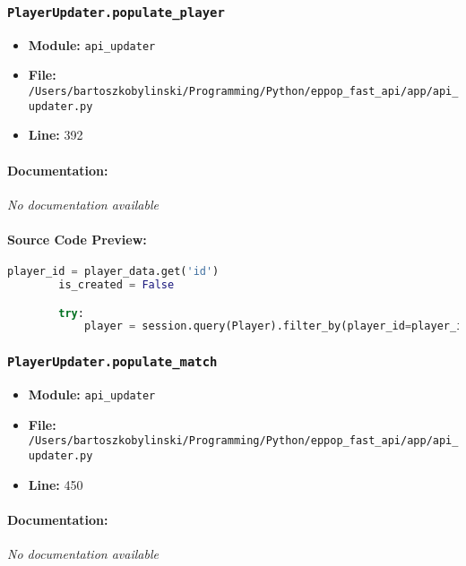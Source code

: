 \documentclass[11pt,a4paper]{article}
\begin{document}
\vspace{1em}
\subsubsection{\texttt{PlayerUpdater.populate\_player}}

\begin{itemize}
    \item \textbf{Module:} \texttt{api\_updater}
    \item \textbf{File:} \texttt{/Users/bartoszkobylinski/Programming/Python/eppop\_fast\_api/app/api\_updater.py}
    \item \textbf{Line:} 392
\end{itemize}

\paragraph{Documentation:} \textit{No documentation available}

\paragraph{Source Code Preview:}
\begin{lstlisting}[language=Python]
        player_id = player_data.get('id')
        is_created = False

        try:
            player = session.query(Player).filter_by(player_id=player_id).one_or_none()
\end{lstlisting}

\vspace{1em}
\subsubsection{\texttt{PlayerUpdater.populate\_match}}

\begin{itemize}
    \item \textbf{Module:} \texttt{api\_updater}
    \item \textbf{File:} \texttt{/Users/bartoszkobylinski/Programming/Python/eppop\_fast\_api/app/api\_updater.py}
    \item \textbf{Line:} 450
\end{itemize}

\paragraph{Documentation:} \textit{No documentation available}
\end{document}
